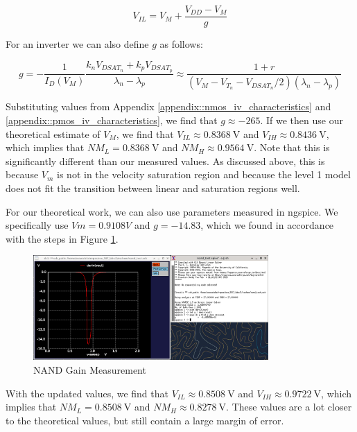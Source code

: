 \documentclass[fleqn]{article}
\begin{document}
	\begin{equation}
		\label{eq::vil_theory}
		V_{IL} = V_{M} + \frac{V_{DD} - V_M}{g}
	\end{equation}
	
	\noindent For an inverter we can also define $g$ as follows:
	
	\begin{equation}
		\label{eq::g_theory}
		g = -\frac{1}{I_D(V_M)}\frac{k_nV_{DSAT_n} + k_pV_{DSAT_p}}{\lambda_n - \lambda_p} \approx \frac{1 + r}{(V_M - V_{T_n} - V_{DSAT_n}/2)(\lambda_n - \lambda_p)}
	\end{equation}
	
	\noindent Substituting values from Appendix \ref{appendix::nmos_iv_characteristics} and \ref{appendix::pmos_iv_characteristics}, we find that $g \approx -265$. If we then use our theoretical estimate of $V_{M}$, we find that $V_{IL} \approx 0.8368\ \text{V}$ and $V_{IH} \approx 0.8436\ \text{V}$, which implies that $NM_L = 0.8368\ \text{V}$ and $NM_H \approx 0.9564\ \text{V}$. Note that this is  significantly different than our measured values. As discussed above, this is because $V_m$ is not in the velocity saturation region and because the level 1 model does not fit the transition between linear and saturation regions well.
	
	For our theoretical work, we can also use parameters measured in ngspice. We specifically use $Vm = 0.9108 V$ and $g = -14.83$, which we found in accordance with the steps in Figure \ref{fig::nand_noise_analysis_g_sweep_va_vb}.
	
	\begin{figure}[H]
		\centerline{\includegraphics[width=0.8\textwidth]{nand_noise_analysis_g_sweep_va_vb.png}}
		\caption{NAND Gain Measurement}
		\label{fig::nand_noise_analysis_g_sweep_va_vb}
	\end{figure}
	
	\noindent With the updated values, we find that $V_{IL} \approx 0.8508\ \text{V}$ and $V_{IH} \approx 0.9722\ \text{V}$, which implies that $NM_L = 0.8508\ \text{V}$ and $NM_H \approx 0.8278\ \text{V}$. These values are a lot closer to the theoretical values, but still contain a large margin of error.
	
\end{document}
